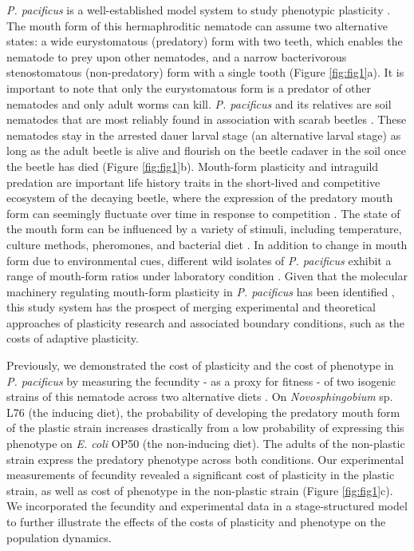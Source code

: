 \documentclass[10pt,letterpaper]{article}
\newcommand{\ecoli}{\emph{E. coli} OP50}
\newcommand{\novo}{\emph{Novosphingobium} sp. L76}
\newcommand{\ppac}{\emph{P. pacificus}}
\begin{document}
\hspace{5cm}

\ppac{} is a well-established model system to study phenotypic plasticity \cite{Sommer2013a}. The mouth form of this hermaphroditic nematode can assume two alternative states: a wide eurystomatous (predatory) form with two teeth, which enables the nematode to prey upon other nematodes, and a narrow bacterivorous stenostomatous (non-predatory) form with a single tooth (Figure \ref{fig:fig1}a). It is important to note that only the eurystomatous form is a predator of other nematodes and only adult worms can kill. \ppac{} and its relatives are soil nematodes that are most reliably found in association with scarab beetles \cite{Herrmann2007a, KANZAKI2021}. These nematodes stay in the arrested dauer larval stage (an alternative larval stage) as long as the adult beetle is alive and flourish on the beetle cadaver in the soil once the beetle has died \cite{Meyer2017a, Renahan2021aa} (Figure \ref{fig:fig1}b). Mouth-form plasticity and intraguild predation are important life history traits in the short-lived and competitive ecosystem of the decaying beetle, where the expression of the predatory mouth form can seemingly fluctuate over time in response to competition \cite{Renahan2021aa, Renahan2022a}. The state of the mouth form can be influenced by a variety of stimuli, including temperature, culture methods, pheromones, and bacterial diet \cite{Lenuzzi2021, Werner2017, Werner2018a, Akduman2020a}. In addition to change in mouth form due to environmental cues, different wild isolates of \ppac{} exhibit a range of mouth-form ratios under laboratory condition \cite{Ragsdale2013}. Given that the molecular machinery regulating mouth-form plasticity in \ppac{} has been identified \cite{Kieninger2016, Sieriebriennikov2018, Bui2018, Namdeo2018, Sieriebriennikov2020}, this study system has the prospect of merging experimental and theoretical approaches of plasticity research and associated boundary conditions, such as the costs of adaptive plasticity.   

\hspace{5cm}

Previously, we demonstrated the cost of plasticity and the cost of phenotype in \ppac{} by measuring the fecundity - as a proxy for fitness - of two isogenic strains of this nematode across two alternative diets \cite{Dardiry2023}. On \novo{} (the inducing diet), the probability of developing the predatory mouth form of the plastic strain increases drastically from a low probability of expressing this phenotype on \ecoli{} (the non-inducing diet). The adults of the non-plastic strain express the predatory phenotype across both conditions. Our experimental measurements of fecundity revealed a significant cost of plasticity in the plastic strain, as well as cost of phenotype in the non-plastic strain (Figure \ref{fig:fig1}c). We incorporated the fecundity and experimental data in a stage-structured model to further illustrate the effects of the costs of plasticity and phenotype on the population dynamics.
\end{document}
